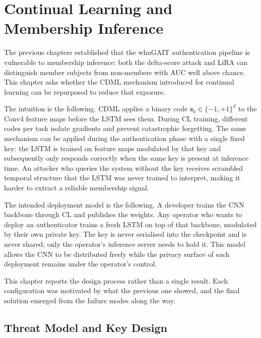 


\chapter{Continual Learning and Membership Inference}
\label{ch:cl_mia}

The previous chapters established that the whuGAIT authentication pipeline is vulnerable to membership inference: both the delta-score attack and LiRA can distinguish member subjects from non-members with AUC well above chance. This chapter asks whether the CDML mechanism introduced for continual learning can be repurposed to reduce that exposure.

The intuition is the following. CDML applies a binary code $\mathbf{s}_k \in \{-1,+1\}^d$ to the Conv4 feature maps before the LSTM sees them. During CL training, different codes per task isolate gradients and prevent catastrophic forgetting. The same mechanism can be applied during the authentication phase with a single fixed key: the LSTM is trained on feature maps modulated by that key and subsequently only responds correctly when the same key is present at inference time. An attacker who queries the system without the key receives scrambled temporal structure that the LSTM was never trained to interpret, making it harder to extract a reliable membership signal.

The intended deployment model is the following. A developer trains the CNN backbone through CL and publishes the weights. Any operator who wants to deploy an authenticator trains a fresh LSTM on top of that backbone, modulated by their own private key. The key is never serialised into the checkpoint and is never shared; only the operator's inference server needs to hold it. This model allows the CNN to be distributed freely while the privacy surface of each deployment remains under the operator's control.

This chapter reports the design process rather than a single result. Each configuration was motivated by what the previous one showed, and the final solution emerged from the failure modes along the way.

\section{Threat Model and Key Design}
\label{sec:cl_threat}

